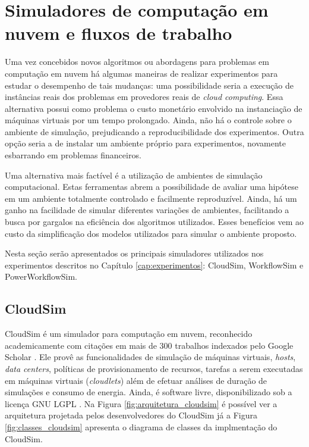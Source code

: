 \section{Simuladores de computação em nuvem e fluxos de trabalho}
\label{sec:ambiente_simulacao}
Uma vez concebidos novos algoritmos ou abordagens para problemas em computação
em nuvem há algumas maneiras de realizar experimentos para estudar o desempenho
de tais mudanças: uma possibilidade seria a execução de instâncias
reais dos problemas em provedores reais de \emph{cloud computing}. Essa alternativa
possui como problema o custo monetário envolvido na instanciação de máquinas
virtuais por um tempo prolongado. Ainda, não há o controle sobre o ambiente 
de simulação, prejudicando a reproducibilidade dos experimentos. Outra opção
seria a de instalar um ambiente próprio para experimentos, novamente esbarrando
em problemas financeiros. 

Uma alternativa mais factível é a utilização de ambientes de simulação computacional.
Estas ferramentas abrem a possibilidade de avaliar uma hipótese em um ambiente
totalmente controlado e facilmente reproduzível. Ainda, há um ganho na facilidade
de simular diferentes variações de ambientes, facilitando a busca por gargalos
na eficiência dos algoritmos utilizados. Esses benefícios vem ao custo da
simplificação dos modelos utilizados para simular o ambiente proposto.

Nesta seção serão apresentados os principais simuladores utilizados nos 
experimentos descritos no Capítulo \ref{cap:experimentos}: CloudSim, WorkflowSim
e PowerWorkflowSim.

\subsection{CloudSim}

CloudSim \cite{calheiros:cloudsim} é um simulador para computação em nuvem,
reconhecido academicamente com citações em mais de 300 trabalhos indexados pelo
Google Scholar \cite{google:cloudsim}. Ele provê as funcionalidades de simulação
de máquinas virtuais, \emph{hosts}, \emph{data centers}, políticas de
provisionamento de recursos, tarefas a serem executadas em máquinas virtuais
(\emph{cloudlets}) além de efetuar análises de duração de simulações e consumo
de energia. Ainda, é software livre, disponibilizado sob a licença GNU LGPL
\cite{cloudsim:site}. Na Figura \ref{fig:arquitetura_cloudsim} é possível ver a
arquitetura projetada pelos desenvolvedores do CloudSim já a Figura
\ref{fig:classes_cloudsim} apresenta o diagrama de classes da implmentação do
CloudSim.

